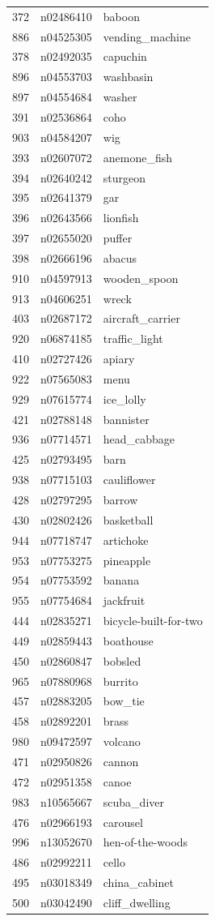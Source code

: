 \begin{table}
\begin{tabular}{cll}
372 & n02486410 & baboon \\
886 & n04525305 & vending_machine \\
378 & n02492035 & capuchin \\
896 & n04553703 & washbasin \\
897 & n04554684 & washer \\
391 & n02536864 & coho \\
903 & n04584207 & wig \\
393 & n02607072 & anemone_fish \\
394 & n02640242 & sturgeon \\
395 & n02641379 & gar \\
396 & n02643566 & lionfish \\
397 & n02655020 & puffer \\
398 & n02666196 & abacus \\
910 & n04597913 & wooden_spoon \\
913 & n04606251 & wreck \\
403 & n02687172 & aircraft_carrier \\
920 & n06874185 & traffic_light \\
410 & n02727426 & apiary \\
922 & n07565083 & menu \\
929 & n07615774 & ice_lolly \\
421 & n02788148 & bannister \\
936 & n07714571 & head_cabbage \\
425 & n02793495 & barn \\
938 & n07715103 & cauliflower \\
428 & n02797295 & barrow \\
430 & n02802426 & basketball \\
944 & n07718747 & artichoke \\
953 & n07753275 & pineapple \\
954 & n07753592 & banana \\
955 & n07754684 & jackfruit \\
444 & n02835271 & bicycle-built-for-two \\
449 & n02859443 & boathouse \\
450 & n02860847 & bobsled \\
965 & n07880968 & burrito \\
457 & n02883205 & bow_tie \\
458 & n02892201 & brass \\
980 & n09472597 & volcano \\
471 & n02950826 & cannon \\
472 & n02951358 & canoe \\
983 & n10565667 & scuba_diver \\
476 & n02966193 & carousel \\
996 & n13052670 & hen-of-the-woods \\
486 & n02992211 & cello \\
495 & n03018349 & china_cabinet \\
500 & n03042490 & cliff_dwelling \\
\bottomrule
\end{tabular}
\end{table}
